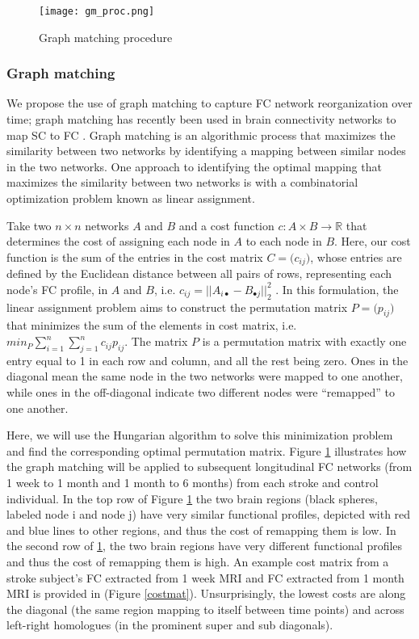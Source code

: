 \documentclass[10pt]{article}
\begin{document}
	\begin{figure}[h]
		\texttt{[image: gm\_proc.png]}
		\caption{Graph matching procedure}
		\label{figure1}
		\centering
	\end{figure}
	
	\subsubsection*{Graph matching}
	We propose the use of graph matching to capture FC network reorganization over time; graph matching has recently been used in brain connectivity networks to map SC to FC \cite{Osmanlioglu2019-ao}. Graph matching is an algorithmic process that maximizes the similarity between two networks by identifying a mapping between similar nodes in the two networks. One approach to identifying the optimal mapping that maximizes the similarity between two networks is with a combinatorial optimization problem known as linear assignment. 
	
	Take two $n \times n $ networks $A$ and $B$ and a cost function $c: A \times B \rightarrow  \mathbb{R}$  that determines the cost of assigning each node in $A$ to each node in $B$. Here, our cost function is the sum of the entries in the cost matrix $C = \big(c_{i j}\big)$, whose entries are defined by the Euclidean distance between all pairs of rows, representing each node’s FC profile, in $A$ and $B$, i.e. $c_{ij}=|| A_{i\bullet}-B_{\bullet j} ||^2_2$ . In this formulation, the linear assignment problem aims to construct the permutation matrix $P = \big(p_{i j}\big)$ that minimizes the sum of the elements in cost matrix, i.e. $min_P\sum^n_{i=1}\sum^n_{j=1}c_{ij}p_{ij}$. The matrix $P$ is a permutation matrix with exactly one entry equal to 1 in each row and column, and all the rest being zero. Ones in the diagonal mean the same node in the two networks were mapped to one another, while ones in the off-diagonal indicate two different nodes were “remapped” to one another. 
	
	Here, we will use the Hungarian algorithm to solve this minimization problem and find the corresponding optimal permutation matrix. Figure \ref{figure1} illustrates how the graph matching will be applied to subsequent longitudinal FC networks (from 1 week to 1 month and 1 month to 6 months) from each stroke and control individual. In the top row of Figure \ref{figure1} the two brain regions (black spheres, labeled node i and node j) have very similar functional profiles, depicted with red and blue lines to other regions, and thus the cost of remapping them is low. In the second row of \ref{figure1}, the two brain regions have very different functional profiles and thus the cost of remapping them is high. An example cost matrix from a stroke subject’s FC extracted from 1 week MRI and FC extracted from 1 month MRI is provided in (Figure \ref{costmat}). Unsurprisingly, the lowest costs are along the diagonal (the same region mapping to itself between time points) and across left-right homologues (in the prominent super and sub diagonals).
\end{document}
